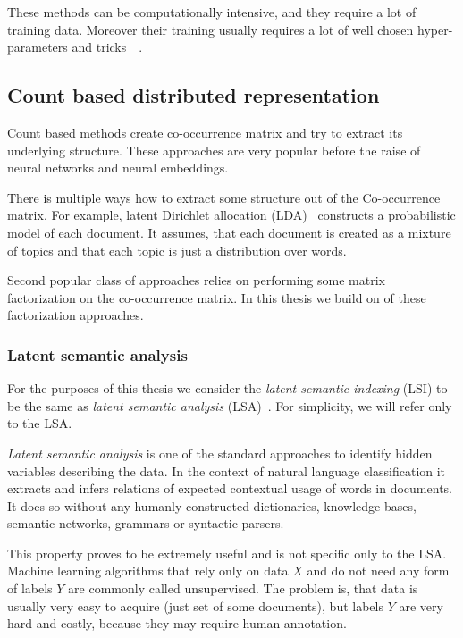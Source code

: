     These methods can be computationally intensive, and they require a lot of training data. 
    Moreover their training usually requires a lot of well chosen hyper-parameters and tricks~\cite{DBLP:journals/corr/MikolovSCCD13}~\cite{vajdova2017}. %
    

    \subsection{Count based distributed representation}
    
    Count based methods create co-occurrence matrix and try to extract its underlying structure.
    These approaches are very popular before the raise of neural networks and neural embeddings.
    
    There is multiple ways how to extract some structure out of the Co-occurrence matrix.
    For example, latent Dirichlet allocation (LDA)~\cite{blei2003latent} constructs a probabilistic model of each document. 
    It assumes, that each document is created as a mixture of topics and that each topic is just a distribution over words. 
    
    Second popular class of approaches relies on performing some matrix factorization on the co-occurrence matrix.
    In this thesis we build on of these factorization approaches.
    
    \subsubsection{Latent semantic analysis} \label{sec:lsa}
    
    For the purposes of this thesis we consider the \emph{latent semantic indexing} (LSI) to be the same as \emph{latent semantic analysis} (LSA)~\cite{deerwester1990indexing}.
    For simplicity, we will refer only to the LSA.
    
    \emph{Latent semantic analysis} is one of the standard approaches to identify hidden variables describing the data.
    In the context of natural language classification it extracts and infers relations of expected contextual usage of words in documents.
    It does so without any humanly constructed dictionaries, knowledge bases, semantic networks, grammars or syntactic parsers.
    
    This property proves to be extremely useful and is not specific only to the LSA.
    Machine learning algorithms that rely only on data $X$ and do not need any form of labels $Y$ are commonly called unsupervised.
    The problem is, that data is usually very easy to acquire (just set of some documents), but labels $Y$ are very hard and costly, because they may require human annotation.
    
